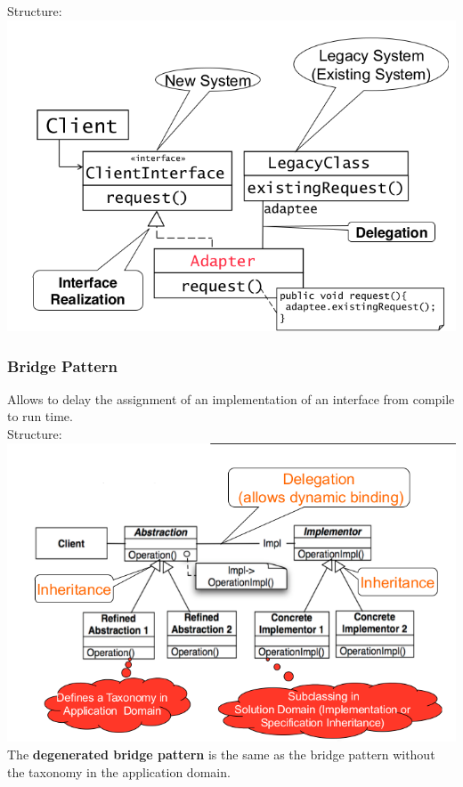 Structure:\\
\includegraphics[width=\linewidth]{images/pattern_adapter.png}
\newpage

\subsubsection{Bridge Pattern}
Allows to delay the assignment of an implementation of an interface from compile to run time.\\
Structure:\\
\includegraphics[width=\linewidth]{images/pattern_bridge.png}
The \textbf{degenerated bridge pattern} is the same as the bridge pattern without the taxonomy in the application domain.
\newpage

